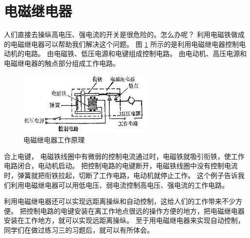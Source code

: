 \section{电磁继电器}\label{sec:10-6}

人们直接去操纵高电压、强电流的开关是很危险的。怎么办呢？
利用电磁铁做成的电磁继电器可以帮助我们解决这个问题。
图 \ref{fig:10-30} 所示的是利用电磁继电器控制电动机的电路。
由电磁铁、低压电源和电键组成控制电路。
由电动机、高压电源和电磁继电器的触点部分组成工作电路。
\begin{figure}[htbp]
    \centering
    \includegraphics[width=0.6\textwidth]{../pic/czwl2-ch10-30}
    \caption{电磁继电器工作原理}\label{fig:10-30}
\end{figure}
合上电键， 电磁铁线圈中有微弱的控制电流通过时，电磁铁就吸引衔铁，使工作电路闭合，电动机启动。
把控制电路的电键断开，电磁铁线圈中没有控制电流时，弹簧就把衔铁拉起，切断了工作电路，电动机就停止工作。
这个例子告诉我们利用电磁继电器可以用低电压、弱电流控制高电压、强电流的工作电路。

利用电磁继电器还可以实现远距离操纵和自动控制，这给人们的工作带来不少方便。
把控制电路的电键安装在离工作地点很远的操作方便的地方，把电磁继电器安装在工作地方，就可以实现远距离操纵。
至于用电磁继电器来实现自动控制，同学们在做过练习三的习题后，就可以有所体会。

